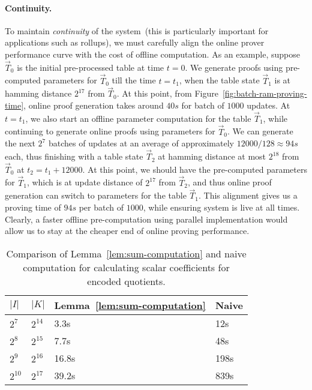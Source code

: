 \paragraph{\bf Continuity.} To maintain {\em continuity} of the system~(this is particularly important for applications such as rollups), we must carefully
align the online prover performance curve with the cost of offline computation.  As an example, suppose $\vec{T}_0$
is the initial pre-processed table at time $t=0$. We generate proofs using pre-computed parameters for $\vec{T}_0$
till the time $t=t_1$, when the table state $\vec{T}_1$ is at hamming distance $2^{17}$ from $\vec{T}_0$. At this point,
from Figure~\ref{fig:batch-ram-proving-time}, online proof generation takes around $40s$ for batch of $1000$ updates.
At $t=t_1$, we also start an offline parameter computation for the table $\vec{T}_1$, while continuing to generate
online proofs using parameters for $\vec{T}_0$. We can generate the next $2^7$ batches of updates at an average of
approximately $12000/128\approx 94s$ each, thus finishing with a table state $\vec{T}_2$ at hamming distance at most
$2^{18}$ from $\vec{T}_0$ at $t_2=t_1+12000$. At this point, we should have the pre-computed parameters for $\vec{T}_1$,
which is at update distance of $2^{17}$ from $\vec{T}_2$, and thus online proof generation can switch to parameters
for the table $\vec{T}_1$. This alignment gives us a proving time of $94s$ per batch of $1000$, while ensuring system
is live at all times. Clearly, a faster offline pre-computation using parallel implementation would allow us to stay
at the cheaper end of online proving performance.


\begin{table}[htbp]
    \centering
    \begin{tabularx}{0.45\textwidth}{@{}XXXX@{}}
        \toprule
        $|I|$ & $|K|$ & Lemma~\ref{lem:sum-computation} & Naive \\ \midrule
        $2^7$ & $2^{14}$ & 3.3s  & 12s \\
        $2^8$ & $2^{15}$ & 7.7s  & 48s \\
        $2^9$ & $2^{16}$ & 16.8s & 198s \\
        $2^{10}$ & $2^{17}$ & 39.2s & 839s \\
        \bottomrule
    \end{tabularx}
    \caption{Comparison of Lemma~\ref{lem:sum-computation} and naive computation for calculating
    scalar coefficients for encoded quotients.}
    \label{tbl:sum-computation-compare}
    \vspace*{-5mm}
\end{table}

